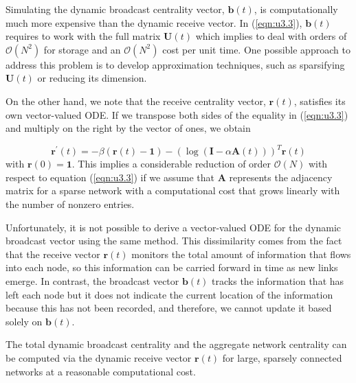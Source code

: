Simulating the dynamic broadcast centrality vector, $\mathbf{b}(t)$, is computationally much more expensive than the dynamic receive vector. In (\ref{eqn:u3.3}), $\mathbf{b}(t)$ requires to work with the full matrix $\mathbf{U}(t)$ which implies to deal with orders of $\mathcal{O}(N^2)$ for storage and an $\mathcal{O}(N^2)$ cost per unit time. One possible approach to address this problem is to develop approximation techniques, such as sparsifying $\mathbf{U}(t)$ or reducing its dimension.

On the other hand, we note that the receive centrality vector, $\mathbf{r}(t)$, satisfies its own vector-valued ODE. If we transpose both sides of the equality in (\ref{eqn:u3.3}) and multiply on the right by the vector of ones, we obtain

\begin{equation}
\label{eqn:u4.1}
    \mathbf{r^{\prime}}(t) = -\beta (\mathbf{r}(t) - \mathbf{1}) - (\log (\mathbf{I} - \alpha \mathbf{A}(t)))^T\mathbf{r}(t)
\end{equation} with $\mathbf{r}(0)=\mathbf{1}$. This implies a considerable reduction of order $\mathcal{O}(N)$ with respect to equation (\ref{eqn:u3.3}) if we assume that $\mathbf{A}$ represents the adjacency matrix for a sparse network with a computational cost that grows linearly with the number of nonzero entries.

Unfortunately, it is not possible to derive a vector-valued ODE for the dynamic broadcast vector using the same method. This dissimilarity comes from the fact that the receive vector $\mathbf{r}(t)$ monitors the total amount of information that flows into each node, so this information can be carried forward in time as new links emerge. In contrast, the broadcast vector $\mathbf{b}(t)$ tracks the information that has left each node but it does not indicate the current location of the information because this has not been recorded, and therefore, we cannot update it based solely on $\mathbf{b}(t)$. 

\newpage

\begin{highlightedParagraphC}
 
The total dynamic broadcast centrality and the aggregate network centrality can be computed via the dynamic receive vector $\mathbf{r}(t)$ for large, sparsely connected networks at a reasonable computational cost.

\end{highlightedParagraphC}

